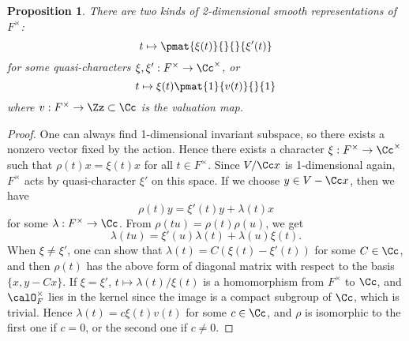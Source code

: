 \documentclass{article}
\newtheorem{proposition}{Proposition}[section]
\begin{document}
\begin{proposition}
There are two kinds of 2-dimensional smooth representations of $F^{\times}$:
$$
t\mapsto \pmat{\xi(t)}{}{}{\xi'(t)}
$$
for some quasi-characters $\xi, \xi':F^{\times} \to \Cc^{\times}$, or 
$$
t\mapsto \xi(t) \pmat{1}{v(t)}{}{1}
$$
where $v:F^{\times}\to \Zz\subset \Cc$ is the valuation map. 
\end{proposition}
\begin{proof}
One can always find 1-dimensional invariant subspace, so there exists a nonzero vector fixed by the action. Hence there exists a character $\xi:F^{\times} \to \Cc^{\times}$ such that $\rho(t)x = \xi(t)x$ for all $t\in F^{\times}$. 
Since $V/\Cc x$ is 1-dimensional again, $F^{\times}$ acts by quasi-character $\xi'$ on this space. 
If we choose $y\in V - \Cc x$, then we have
$$
\rho(t)y = \xi'(t)y + \lambda(t)x
$$
for some $\lambda:F^{\times} \to \Cc$. From $\rho(tu) = \rho(t)\rho(u)$, we get
$$
\lambda(tu) = \xi'(u)\lambda(t) + \lambda(u)\xi(t).
$$
When $\xi\neq \xi'$, one can show that $\lambda(t) = C(\xi(t) - \xi'(t))$ for some $C\in \Cc$, and then $\rho(t)$ has the above form of diagonal matrix with respect to the basis $\{x, y - Cx\}$. 
If $\xi = \xi'$, $t\mapsto \lambda(t)/\xi(t)$ is a homomorphism from $F^{\times}$ to $\Cc$, and $\calO_F^{\times}$ lies in the kernel since the image is a compact subgroup of $\Cc$, which is trivial. 
Hence $\lambda(t) = c\xi(t)v(t)$ for some $c\in \Cc$, and $\rho$ is isomorphic to the first one if $c =0$, or the second one if $c\neq 0$. 
\end{proof}
\end{document}
